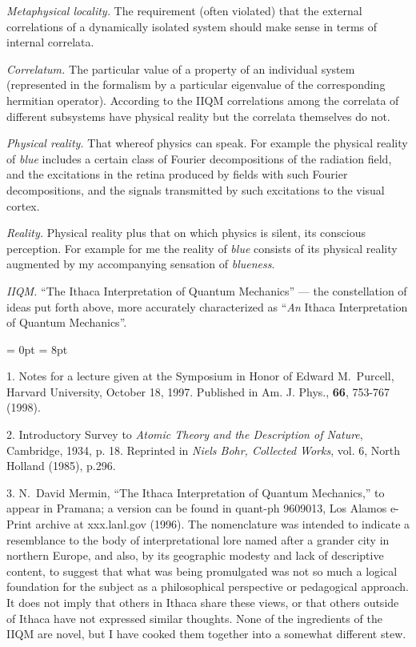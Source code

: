 {{\sl Metaphysical locality.} The requirement (often violated) that the
external correlations of a dynamically isolated system should make
sense in terms of internal correlata.   

{\sl Correlatum.} The particular value of a property of an individual
system (represented in the formalism by a particular eigenvalue of the
corresponding hermitian operator). According to the IIQM correlations
among the correlata of different subsystems have physical reality but
the correlata themselves do not.

{\sl Physical reality.} That whereof physics can speak.  For example the
physical reality of {\it blue\/} includes a certain class of Fourier
decompositions of the radiation field, and the excitations in the
retina produced by fields with such Fourier decompositions, and the
signals transmitted by such excitations to the visual cortex.  

{\sl Reality.} Physical reality plus that on which physics is silent,
its conscious perception.  For example for me the reality of {\it blue}
consists of its physical reality augmented by my accompanying sensation
of {\it blueness\/}.

{\sl IIQM.} ``The Ithaca Interpretation of Quantum Mechanics'' --- the
constellation of ideas put forth above, more accurately characterized
as ``{\it An\/} Ithaca Interpretation of Quantum Mechanics''.

}  


\vfil\eject 

\baselineskip=15pt
\parindent= 0pt
\parskip = 8pt

1.  Notes for a lecture given at the Symposium in Honor of Edward
M.~Purcell, Harvard University, October 18, 1997.  Published in
Am. J. Phys., {\bf 66}, 753-767 (1998).

2.  Introductory Survey to {\it Atomic Theory and
the Description of Nature\/}, Cambridge, 1934, p. 18.  Reprinted in
{\it Niels Bohr, Collected Works\/}, vol. 6, North Holland (1985),
p.296.

3.  N.~David Mermin, ``The Ithaca Interpretation of Quantum
Mechanics,'' to appear in Pramana; a version can be found in quant-ph
9609013, Los Alamos e-Print archive at xxx.lanl.gov (1996).  The
nomenclature was intended to indicate a resemblance to the body of
interpretational lore named after a grander city in northern Europe,
and also, by its geographic modesty and lack of descriptive content,
to suggest that what was being promulgated was not so much a logical
foundation for the subject as a philosophical perspective or
pedagogical approach.  It does not imply that others in Ithaca share
these views, or that others outside of Ithaca have not expressed
similar thoughts.  None of the ingredients of the IIQM are novel, but
I have cooked them together into a somewhat different stew.

